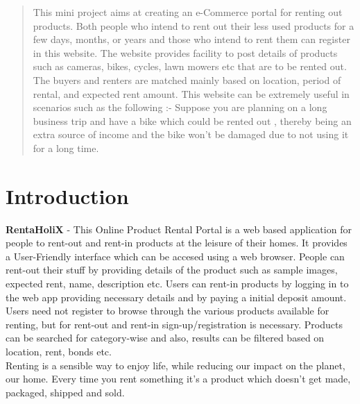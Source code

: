 \documentclass[11pt]{report}
\begin{document}
 
\begin{abstract}

This mini project aims at creating an e-Commerce portal for renting out products. Both people who intend to rent out their less used products for a few days, months, or years and those who intend to rent them can register in this website. The website provides facility to post details of products such as cameras, bikes, cycles, lawn mowers etc that are to be rented out. The buyers and renters are matched mainly based on location, period of rental, and expected rent amount. This website can be extremely useful in scenarios such as the following :-
Suppose you are planning on a long business trip and have a bike which could be rented out , thereby being an extra source of income and the bike won't be damaged due to not using it for a long time.
\end{abstract}

\tableofcontents


\chapter {Introduction}
\label{intro}

 
\textbf{RentaHoliX} - This Online Product Rental Portal is a web based application for people to rent-out and rent-in products at the leisure of their homes. It provides a User-Friendly interface which can be accesed using a web browser. People can rent-out their stuff by providing details of the product such as sample images, expected rent, name, description etc. Users can rent-in products by logging in to the web app providing necessary details and by paying a initial deposit amount. Users need not register to browse through the various products available for renting, but for rent-out and rent-in sign-up/registration is necessary. Products can be searched for category-wise and also, results can be filtered based on location, rent, bonds etc.\\   


Renting is a sensible way to enjoy life, while reducing our impact on the planet, our home. Every time you rent something it’s a product which doesn’t get made, packaged, shipped and sold.
\end{document}
